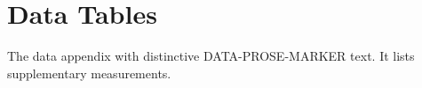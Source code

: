 \chapter{Data Tables}\label{app:data}
The data appendix with distinctive DATA-PROSE-MARKER text.
It lists supplementary measurements.
